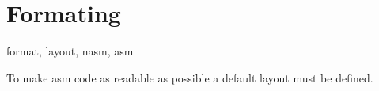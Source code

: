 \section{Formating}
\begin{keywords}
format, layout, nasm, asm
\end{keywords}
To make asm code as readable as possible a default layout must be defined. 
